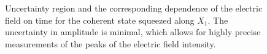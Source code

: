 \begin{figure}
\centering



\caption{Uncertainty region and the corresponding dependence
  of the electric field on time for the coherent state squeezed along
  $X_1$. The uncertainty in amplitude is minimal, which allows for
  highly precise measurements of the peaks of the electric field intensity.} 
\label{figPart3Squeezed_2}
\end{figure}